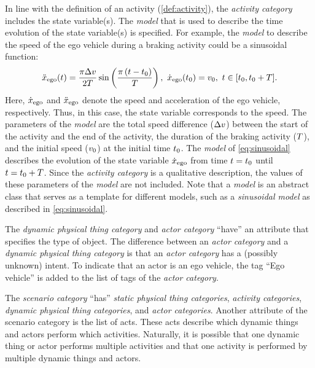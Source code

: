 In line with the definition of an activity (\cref{def:activity}), the \textit{activity category} includes the state variable(s).
The \textit{model} that is used to describe the time evolution of the state  variable(s) is specified. For example, the \textit{model} to describe the speed of the ego vehicle during a braking activity could be a sinusoidal function:
\begin{equation} 
	\label{eq:sinusoidal}
	\egoacceleration(\time) = \frac{\pi \amplitude}{2\duration} \sin \left( \frac{\pi \left( \time - \inittime\right)}{\duration} \right),\ \egospeed(\inittime) = \egospeedinit,\ \time \in [\inittime, \inittime+\duration].
\end{equation}
Here, $\dot{x}_{\mathrm{ego}}$ and $\ddot{x}_{\mathrm{ego}}$ denote the speed and acceleration of the ego vehicle, respectively. Thus, in this case, the state variable corresponds to the speed. 
The parameters of the \textit{model} are the total speed difference ($\Delta v$) between the start of the activity and the end of the activity, the duration of the braking activity ($T$), and the initial speed ($v_{0}$) at the initial time $t_{0}$. 
The \textit{model} of \cref{eq:sinusoidal} describes the evolution of the state variable $\dot{x}_{\mathrm{ego}}$ from time $t=t_{0}$ until $t=t_{0}+T$. Since the \textit{activity category} is a qualitative description, the values of these parameters of the \textit{model} are not included.
\cstartb Note that a \textit{model} is an abstract class that serves as a template for different models, such as a \textit{sinusoidal model} as described in \cref{eq:sinusoidal}. \cendb

The \cstartb \textit{dynamic physical thing category} and \cendb \textit{actor category} ``have'' an attribute that specifies the type of object.
\cstartb The difference between an \textit{actor category} and a \textit{dynamic physical thing category} is that an \textit{actor category} has a (possibly unknown) intent. \cendb
To indicate that an actor is an ego vehicle, the tag ``Ego vehicle'' is added to the list of tags of the \textit{actor category}.

The \textit{scenario category} ``has'' \cstartc \textit{static physical thing categories}\cendc, \textit{activity categories}, \cstartb \textit{dynamic physical thing categories}, \cendb and \textit{actor categories}. 
Another attribute of the scenario category is the list of acts. %
These acts describe which \cstartb dynamic things and \cendb actors perform which activities. Naturally, it is possible that one \cstartb dynamic thing or \cendb actor performs multiple activities and that one activity is performed by multiple \cstartb dynamic things and \cendb actors.


